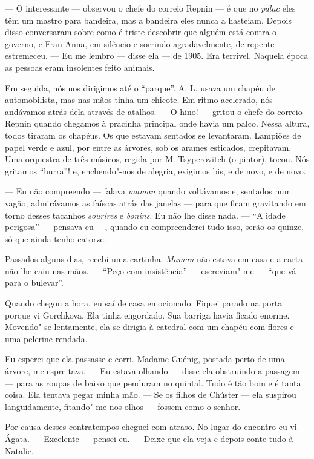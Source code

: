 --- O interessante --- observou o chefe do correio Repnin --- é que no
\emph{palac} eles têm um mastro para bandeira, mas a bandeira eles nunca
a hasteiam. Depois disso conversaram sobre como é triste descobrir que
alguém está contra o governo, e Frau Anna, em silêncio e sorrindo
agradavelmente, de repente estremeceu. --- Eu me lembro --- disse ela
--- de 1905. Era terrível. Naquela época as pessoas eram insolentes
feito animais.

Em seguida, nós nos dirigimos até o ``parque''. A. L. usava um chapéu de
automobilista, mas nas mãos tinha um chicote. Em ritmo acelerado, nós
andávamos atrás dela através de atalhos. --- O hino! --- gritou o chefe
do correio Repnin quando chegamos à pracinha principal onde havia um
palco. Nessa altura, todos tiraram os chapéus. Os que estavam sentados
se levantaram. Lampiões de papel verde e azul, por entre as árvores, sob
os arames esticados, crepitavam. Uma orquestra de três músicos, regida
por M. Tsyperovitch (o pintor), tocou. Nós gritamos ``hurra''! e,
enchendo"-nos de alegria, exigimos bis, e de novo, e de novo.

--- Eu não compreendo --- falava \emph{maman} quando voltávamos e,
sentados num vagão, admirávamos as faíscas atrás das janelas --- para
que ficam gravitando em torno desses tacanhos \emph{sourires} e
\emph{bonins}. Eu não lhe disse nada. --- ``A idade perigosa'' ---
pensava eu ---, quando eu compreenderei tudo isso, serão os quinze, só %
que ainda tenho catorze.

Passados alguns dias, recebi uma cartinha. \emph{Maman} não estava em
casa e a carta não lhe caiu nas mãos. --- ``Peço com insistência'' ---
escreviam"-me --- ``que vá para o bulevar''.

Quando chegou a hora, eu saí de casa emocionado. Fiquei parado na porta
porque vi Gorchkova. Ela tinha engordado. Sua barriga havia ficado
enorme. Movendo"-se lentamente, ela se dirigia à catedral com um chapéu
com flores e uma pelerine rendada.

Eu esperei que ela passasse e corri. Madame Guénig, postada perto de uma
árvore, me espreitava. --- Eu estava olhando --- disse ela obstruindo a
passagem --- para as roupas de baixo que penduram no quintal. Tudo é tão
bom e é tanta coisa. Ela tentava pegar minha mão. --- Se os filhos de
Chúster --- ela suspirou languidamente, fitando"-me nos olhos --- fossem
como o senhor.

Por causa desses contratempos cheguei com atraso. No lugar do encontro
eu vi Ágata. --- Excelente --- pensei eu. --- Deixe que ela veja e
depois conte tudo à Natalie.

